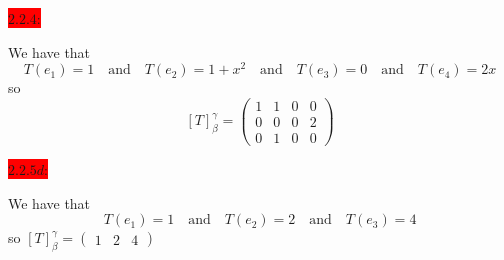 \documentclass{exam}
\begin{document}
\begin{solution}
  \end{solution}


  \colorbox{red}{\underline{$2.2.4$}:}
  \begin{solution}
    We have that 
    \[
      T(e_1) = 1 
      \quad\text{and}\quad
      T(e_2) = 1+x^2
      \quad\text{and}\quad 
      T(e_3) = 0
      \quad\text{and}\quad 
      T(e_4) = 2x
    \]
    so 
    \[
      \left[T\right]_{\beta}^{\gamma} = \begin{pmatrix}
        1 & 1 & 0 & 0 \\
        0 & 0 & 0 & 2 \\
        0 & 1 & 0 & 0 
      \end{pmatrix}
    \]
  \end{solution}

  \newpage

  \colorbox{red}{\underline{$2.2.5d$}:}
  \begin{solution}
    We have that 
    \[
      T(e_1) = 1 
      \quad\text{and}\quad 
      T(e_2) = 2 
      \quad\text{and}\quad
      T(e_3) = 4  
    \]
    so 
    \(
      \left[T\right]_{\beta}^{\gamma} = \begin{pmatrix}
        1 & 2 & 4
      \end{pmatrix}
    \)
  \end{solution}
\end{document}
